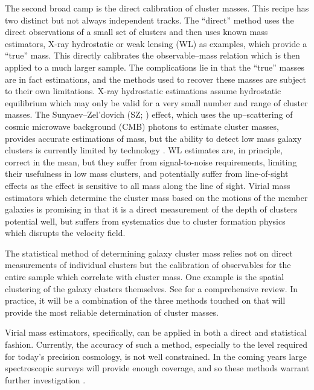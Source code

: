 \documentclass[12pt]{article}
\begin{document}
The second broad camp is the direct calibration of cluster masses. This recipe has two distinct but not always independent tracks. The ``direct'' method uses the direct observations of a small set of clusters and then uses known mass estimators, X-ray hydrostatic or weak lensing (WL) as examples, which provide a ``true'' mass. This directly calibrates the observable--mass relation which is then applied to a much larger sample. The complications lie in that the ``true'' masses are in fact estimations, and the methods used to recover these masses are subject to their own limitations. X-ray hydrostatic estimations assume hydrostatic equilibrium  which may only be valid for a very small number and range of cluster masses. The Sunyaev--Zel’dovich (SZ; \citealt{Sunyaev1972}) effect, which uses the up--scattering of cosmic microwave background (CMB) photons to estimate cluster masses, provides accurate estimations of mass, but the ability to detect low mass galaxy clusters is currently limited by technology . WL estimates are, in principle, correct in the mean, but they suffer from signal-to-noise requirements, limiting their usefulness in low mass clusters, and potentially suffer from line-of-sight effects as the effect is sensitive to all mass along the line of sight. Virial mass estimators which determine the cluster mass based on the motions of the member galaxies is promising in that it is a direct measurement of the depth of clusters potential well, but suffers from systematics due to cluster formation physics which disrupts the velocity field.
 
The statistical method of determining galaxy cluster mass relies not on direct measurements of individual clusters but the calibration of observables for the entire sample which correlate with cluster mass. One example is the spatial clustering of the galaxy clusters themselves. See \cite{Weinberg2013} for a comprehensive review. In practice, it will be a combination of the three methods touched on that will provide the most reliable determination of cluster masses. 

Virial mass estimators, specifically, can be applied in both a direct and statistical fashion. Currently, the accuracy of such a method, especially to the level required for today's precision cosmology, is not well constrained. In the coming years large spectroscopic surveys will provide enough coverage, and so these methods warrant further investigation .
\end{document}
